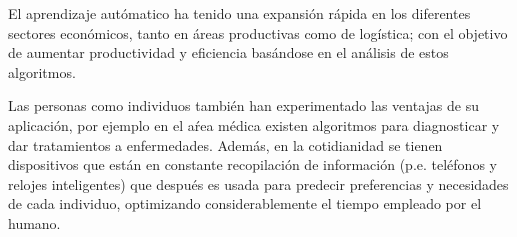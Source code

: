 El aprendizaje autómatico ha tenido una expansión rápida en los diferentes sectores económicos, tanto en áreas productivas como de logística; con el objetivo de aumentar productividad y eficiencia basándose en el análisis de estos algoritmos. \vspace{0.25cm}

Las personas como individuos también han experimentado las ventajas de su aplicación, por ejemplo en el aŕea médica existen algoritmos para diagnosticar y dar tratamientos a enfermedades. Además, en la cotidianidad se tienen dispositivos que están en constante recopilación de información (p.e. teléfonos y relojes inteligentes) que después es usada para predecir preferencias y necesidades de cada individuo, optimizando considerablemente el tiempo empleado por el humano. \vspace{0.25cm}









